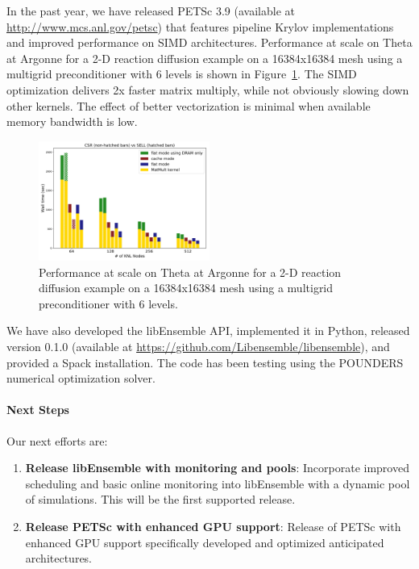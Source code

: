 In the past year, we have released PETSc 3.9 (available at \url{http://www.mcs.anl.gov/petsc})
that features pipeline Krylov implementations and improved performance on SIMD
architectures.  Performance at scale on Theta at Argonne for a 2-D reaction 
diffusion example on a 16384x16384 mesh using a multigrid preconditioner with 
6 levels is shown in Figure~\ref{fig:petsc-tao-fig}. The SIMD optimization 
delivers 2x faster matrix multiply, while not obviously slowing down other 
kernels.  The effect of better vectorization is minimal when available 
memory bandwidth is low.

\begin{figure}
\centering
\includegraphics[width=0.5\textwidth]{projects/2.3.3-MathLibs/2.3.3.06-PETSc-TAO/aij_vs_sell}
\caption{Performance at scale on Theta at Argonne for a 2-D reaction diffusion 
example on a 16384x16384 mesh using a multigrid preconditioner with 
6 levels.}
\label{fig:petsc-tao-fig}
\end{figure}

We have also developed the libEnsemble API, implemented it in Python, released 
version 0.1.0 (available at \url{https://github.com/Libensemble/libensemble}),
and provided a Spack installation.  The code has been testing using the
POUNDERS numerical optimization solver.

\paragraph{Next Steps}

Our next efforts are:
\begin{enumerate}
  \item \textbf{Release libEnsemble with monitoring and pools}: Incorporate improved scheduling 
    and basic online monitoring into libEnsemble with a dynamic pool of simulations.  This will
    be the first supported release.
  \item \textbf{Release PETSc with enhanced GPU support}: Release of PETSc with enhanced GPU 
    support specifically developed and optimized anticipated architectures.
\end{enumerate}

